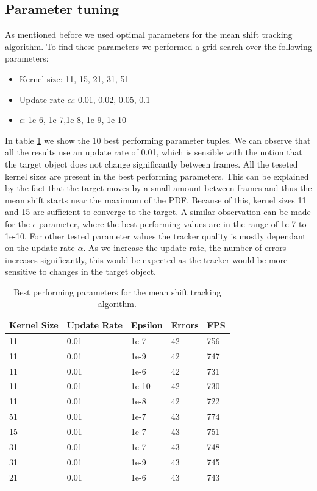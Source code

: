 \documentclass[9pt]{IEEEtran}
\begin{document}
\subsection*{Parameter tuning}
As mentioned before we used optimal parameters for the mean shift tracking algorithm.
To find these parameters we performed a grid search over the following parameters:
\begin{itemize}
    \item Kernel size: 11, 15, 21, 31, 51
    \item Update rate $\alpha$: 0.01, 0.02, 0.05, 0.1
    \item $\epsilon$: 1e-6, 1e-7,1e-8, 1e-9, 1e-10
\end{itemize}
In table \ref{tab:parameters} we show the 10 best performing parameter tuples.
We can observe that all the results use an update rate of 0.01, which is sensible with the notion that the target object does not change significantly between frames.
All the teseted kernel sizes are present in the best performing parameters.
This can be explained by the fact that the target moves by a small amount between frames and thus the mean shift starts near the maximum of the PDF.
Because of this, kernel sizes 11 and 15 are sufficient to converge to the target.
A similar observation can be made for the $\epsilon$ parameter, where the best performing values are in the range of 1e-7 to 1e-10.
For other tested parameter values the tracker quality is mostly dependant on the update rate $\alpha$.
As we increase the update rate, the number of errors increases significantly, this would be expected as the tracker would be more sensitive to changes in the target object.
\begin{table}[!ht]
    \centering
    \begin{tabular}{|lll||l|l|}
    \hline
        Kernel Size & Update Rate & Epsilon & Errors & FPS \\ \hline
        11 & 0.01 & 1e-7 & 42 & 756 \\ 
        11 & 0.01 & 1e-9 & 42 & 747 \\ 
        11 & 0.01 & 1e-6 & 42 & 731 \\ 
        11 & 0.01 & 1e-10 & 42 & 730 \\ 
        11 & 0.01 & 1e-8 & 42 & 722 \\ 
        51 & 0.01 & 1e-7 & 43 & 774 \\ 
        15 & 0.01 & 1e-7 & 43 & 751 \\ 
        31 & 0.01 & 1e-7 & 43 & 748 \\ 
        31 & 0.01 & 1e-9 & 43 & 745 \\ 
        21 & 0.01 & 1e-6 & 43 & 743 \\ \hline
    \end{tabular}
    \caption{Best performing parameters for the mean shift tracking algorithm.}
    \label{tab:parameters}
\end{table}
\end{document}
